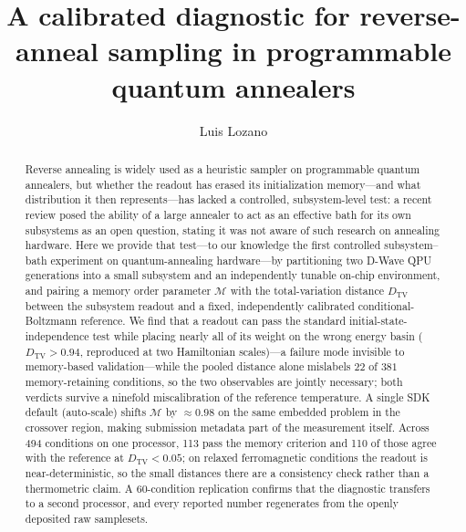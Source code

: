 \documentclass[aps,prapplied,reprint,superscriptaddress,floatfix,nofootinbib]{revtex4-2}
\begin{document}
\title{A calibrated diagnostic for reverse-anneal sampling in programmable quantum annealers}

\author{Luis Lozano}

\begin{abstract}
Reverse annealing is widely used as a heuristic sampler on programmable quantum annealers, but whether the readout has erased its initialization memory---and what distribution it then represents---has lacked a controlled, subsystem-level test: a recent review posed the ability of a large annealer to act as an effective bath for its own subsystems as an open question, stating it was not aware of such research on annealing hardware.
Here we provide that test---to our knowledge the first controlled subsystem--bath experiment on quantum-annealing hardware---by partitioning two D-Wave QPU generations into a small subsystem and an independently tunable on-chip environment, and pairing a memory order parameter $\mathcal{M}$ with the total-variation distance $D_{\mathrm{TV}}$ between the subsystem readout and a fixed, independently calibrated conditional-Boltzmann reference.
We find that a readout can pass the standard initial-state-independence test while placing nearly all of its weight on the wrong energy basin ($D_{\mathrm{TV}}>0.94$, reproduced at two Hamiltonian scales)---a failure mode invisible to memory-based validation---while the pooled distance alone mislabels $22$ of $381$ memory-retaining conditions, so the two observables are jointly necessary; both verdicts survive a ninefold miscalibration of the reference temperature.
A single SDK default (auto-scale) shifts $\mathcal{M}$ by $\approx 0.98$ on the same embedded problem in the crossover region, making submission metadata part of the measurement itself.
Across 494 conditions on one processor, 113 pass the memory criterion and 110 of those agree with the reference at $D_{\mathrm{TV}}<0.05$; on relaxed ferromagnetic conditions the readout is near-deterministic, so the small distances there are a consistency check rather than a thermometric claim.
A 60-condition replication confirms that the diagnostic transfers to a second processor, and every reported number regenerates from the openly deposited raw samplesets.
\end{abstract}

\maketitle
\end{document}
